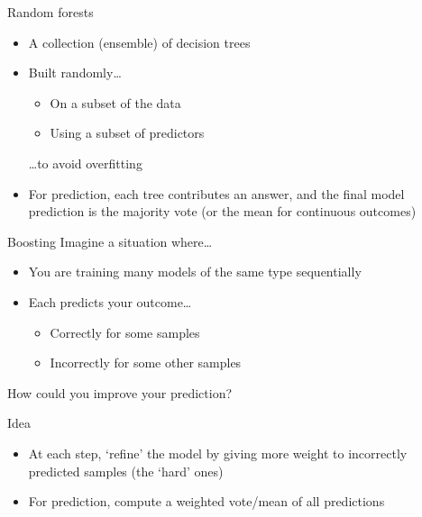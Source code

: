 \begin{frame}{Random forests}
    \begin{itemize}
        \item A collection (\alert{ensemble}) of decision trees \\[\bigskipamount]
        \item Built randomly\ldots
              \begin{itemize}
                  \item On a subset of the data
                  \item Using a subset of predictors
              \end{itemize}
              \ldots to avoid overfitting \\[\bigskipamount]
        \item For prediction, each tree contributes an answer, and the final
              model prediction is the majority vote (or the mean for continuous
              outcomes)
    \end{itemize}
\end{frame}

\begin{frame}{Boosting}
    Imagine a situation where\ldots
    \begin{itemize}
        \item You are training many models of the same type
              \alert{sequentially}
        \item Each predicts your outcome\ldots
              \begin{itemize}
                  \item Correctly for some samples
                  \item Incorrectly for some other samples
              \end{itemize}
    \end{itemize}
    How could you improve your prediction?
    \vfill\pause
    \begin{block}{Idea}
        \begin{itemize}
            \item At each step, `refine' the model by giving more weight to
                  incorrectly predicted samples (the `hard' ones)
            \item For prediction, compute a weighted vote/mean of \alert{all}
                  predictions
        \end{itemize}
    \end{block}
\end{frame}



